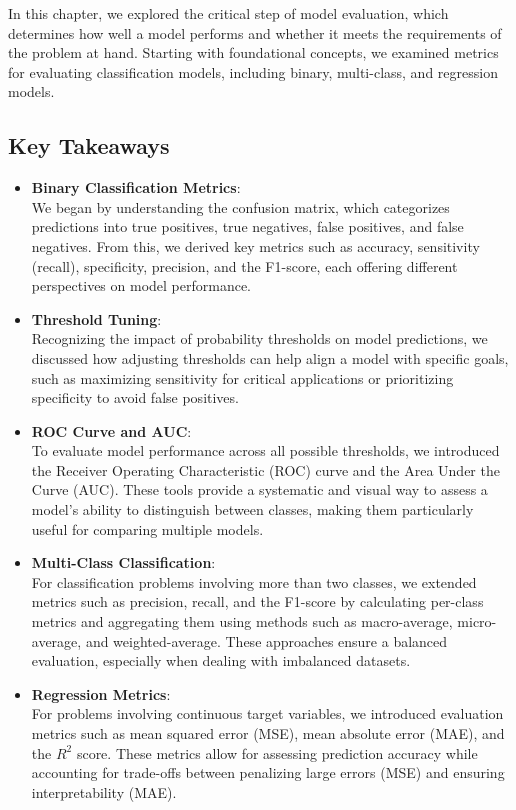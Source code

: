 \documentclass[
]{book}
\theoremstyle{definition}
\theoremstyle{definition}
\theoremstyle{definition}
\theoremstyle{definition}
\theoremstyle{remark}
\begin{document}
In this chapter, we explored the critical step of model evaluation, which determines how well a model performs and whether it meets the requirements of the problem at hand. Starting with foundational concepts, we examined metrics for evaluating classification models, including binary, multi-class, and regression models.

\subsection*{Key Takeaways}\label{key-takeaways-1}

\begin{itemize}
\item
  \textbf{Binary Classification Metrics}:\\
  We began by understanding the confusion matrix, which categorizes predictions into true positives, true negatives, false positives, and false negatives. From this, we derived key metrics such as accuracy, sensitivity (recall), specificity, precision, and the F1-score, each offering different perspectives on model performance.
\item
  \textbf{Threshold Tuning}:\\
  Recognizing the impact of probability thresholds on model predictions, we discussed how adjusting thresholds can help align a model with specific goals, such as maximizing sensitivity for critical applications or prioritizing specificity to avoid false positives.
\item
  \textbf{ROC Curve and AUC}:\\
  To evaluate model performance across all possible thresholds, we introduced the Receiver Operating Characteristic (ROC) curve and the Area Under the Curve (AUC). These tools provide a systematic and visual way to assess a model's ability to distinguish between classes, making them particularly useful for comparing multiple models.
\item
  \textbf{Multi-Class Classification}:\\
  For classification problems involving more than two classes, we extended metrics such as precision, recall, and the F1-score by calculating per-class metrics and aggregating them using methods such as macro-average, micro-average, and weighted-average. These approaches ensure a balanced evaluation, especially when dealing with imbalanced datasets.
\item
  \textbf{Regression Metrics}:\\
  For problems involving continuous target variables, we introduced evaluation metrics such as mean squared error (MSE), mean absolute error (MAE), and the \(R^2\) score. These metrics allow for assessing prediction accuracy while accounting for trade-offs between penalizing large errors (MSE) and ensuring interpretability (MAE).
\end{itemize}
\end{document}
